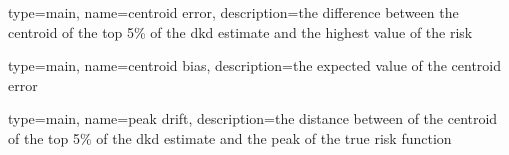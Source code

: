{%
   type=main,
   name={centroid error},
   description={the difference between the centroid of the top 5\% of the dkd estimate and the highest value of the risk}
}

{%
   type=main,
   name={centroid bias},
   description={the expected value of the centroid error}
}

{%
   type=main,
   name={peak drift},
   description={the distance between of the centroid of the top 5\% of the dkd estimate and the peak of the true risk function}
}



